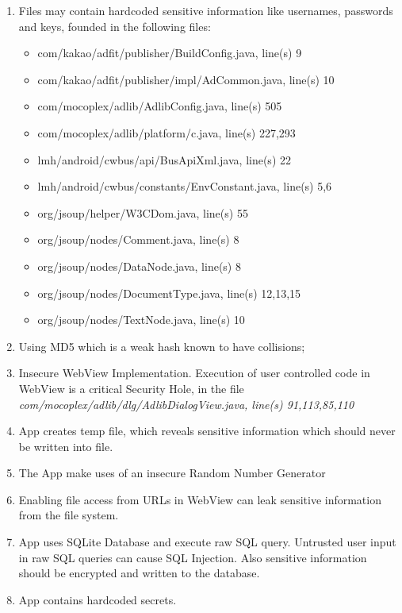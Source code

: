 \begin{itemize}
\begin{enumerate}
            \item Files may contain hardcoded sensitive information like usernames, passwords and keys, founded in the following files:
            \begin{itemize}
                \item com/kakao/adfit/publisher/BuildConfig.java, line(s) 9
                \item com/kakao/adfit/publisher/impl/AdCommon.java, line(s) 10
                \item com/mocoplex/adlib/AdlibConfig.java, line(s) 505
                \item com/mocoplex/adlib/platform/c.java, line(s) 227,293
                \item lmh/android/cwbus/api/BusApiXml.java, line(s) 22
                \item lmh/android/cwbus/constants/EnvConstant.java, line(s) 5,6
                \item org/jsoup/helper/W3CDom.java, line(s) 55
                \item org/jsoup/nodes/Comment.java, line(s) 8
                \item org/jsoup/nodes/DataNode.java, line(s) 8
                \item org/jsoup/nodes/DocumentType.java, line(s) 12,13,15
                \item org/jsoup/nodes/TextNode.java, line(s) 10
            \end{itemize}
            \item Using MD5 which is a weak hash known to have collisions;
            \item Insecure WebView Implementation. Execution of user controlled code in WebView is a critical Security Hole, in the file \textit{com/mocoplex/adlib/dlg/AdlibDialogView.java, line(s) 91,113,85,110}
            \item App creates temp file, which reveals sensitive information which should never be written into file.
            \item The App make uses of an insecure Random Number Generator
            \item Enabling file access from URLs in WebView can leak sensitive information from the file system.
            \item App uses SQLite Database and execute raw SQL query. Untrusted user input in raw SQL queries can cause SQL Injection. Also sensitive information should be encrypted and written to the database.
            \item App contains hardcoded secrets.

\end{enumerate}
\end{itemize}
